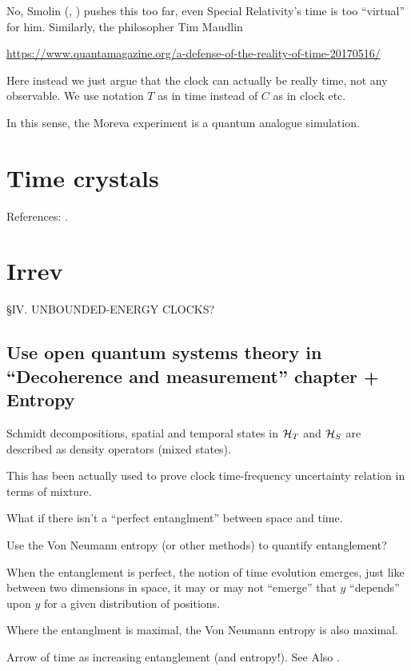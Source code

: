 No, Smolin
(, )
pushes this too far, even Special Relativity's time is too ``virtual'' for him.
Similarly, the philosopher Tim Maudlin

\url{https://www.quantamagazine.org/a-defense-of-the-reality-of-time-20170516/}

Here instead we just argue that the clock can actually be really time, not any observable.
We use notation $T$ as in time instead of $C$ as in clock etc.

In this sense, the Moreva experiment is a quantum analogue simulation.


\section{Time crystals}

References: \cite{crystal2,crystal3,crystal2012}.


\section{Irrev}

\cite{Maccone:Pauli} \S IV.  UNBOUNDED-ENERGY CLOCKS?

\subsection{Use open quantum systems theory in ``Decoherence and measurement'' chapter + Entropy}
Schmidt decompositions, spatial and temporal states in
$\mathcal{H}_T$ and $\mathcal{H}_S$
are described as density operators
(mixed states).

This has been actually used to prove clock time-frequency uncertainty relation
in terms of mixture.

What if there isn't a ``perfect entanglment'' between space and time.

Use the Von Neumann entropy (or other methods) to quantify entanglement?

When the entanglement is perfect, the notion of time evolution emerges, just
like between two dimensions in space, it may or may not ``emerge'' that
$y$ ``depends'' upon $y$ for a given distribution of positions.

Where the entanglment is maximal, the Von Neumann entropy is also maximal.

Arrow of time as increasing entanglement (and entropy!). See Also
\cite{Marletto:Evolution}.

